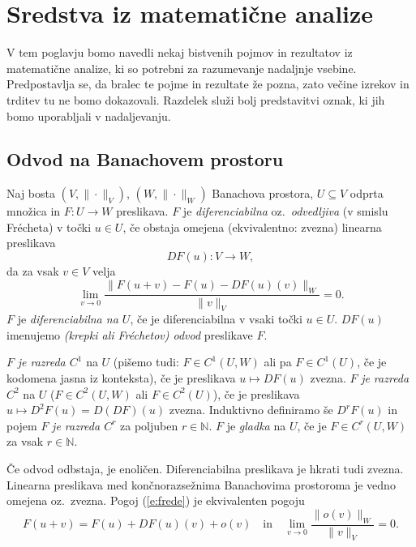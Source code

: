 \chapter{Sredstva iz matematične analize}


V tem poglavju bomo navedli nekaj bistvenih pojmov in rezultatov iz matematične analize,
ki so potrebni za razumevanje nadaljnje vsebine. Predpostavlja
se, da bralec te pojme in rezultate že pozna, zato večine izrekov in trditev
tu ne bomo dokazovali. Razdelek služi bolj predstavitvi oznak, ki jih
bomo uporabljali v nadaljevanju.


\section{Odvod na Banachovem prostoru}


\begin{definicija} \label{def:odvod}
	Naj bosta $(V,\|\cdot\|_V)$, $(W,\|\cdot\|_W)$ Banachova prostora, $U\subseteq V$ odprta
	množica in $F\colon U\to W$ preslikava. $F$ je \emph{diferenciabilna} oz.~\emph{odvedljiva}
	(v smislu Frécheta) v točki $u\in U$, če obstaja omejena (ekvivalentno: zvezna) linearna preslikava
	\[ DF(u)\colon V\to W, \]
	da za vsak $v\in V$ velja
	\begin{equation} \label{e:frede}
		\lim_{v\to 0}\frac{\|F(u+v)-F(u)-DF(u)(v)\|_W}{\|v\|_V}=0.
	\end{equation}
	$F$ je \emph{diferenciabilna na $U$}, če je diferenciabilna v vsaki točki $u\in U$.
	$DF(u)$ imenujemo \emph{(krepki ali Fréchetov) odvod} preslikave $F$.
	
	$F$ \emph{je razreda $C^1$} na $U$ (pišemo tudi: $F\in C^1(U,W)$ ali pa $F\in C^1(U)$,
	če je kodomena jasna iz konteksta), če je preslikava $u\mapsto DF(u)$ zvezna.
	$F$ \emph{je razreda $C^2$} na $U$ ($F\in C^2(U,W)$ ali $F\in C^2(U)$),
	če je preslikava $u\mapsto D^2F(u)=D(DF)(u)$ zvezna. Induktivno definiramo še $D^rF(u)$ in pojem
	$F$ \emph{je razreda $C^r$} za poljuben $r\in\mathbb{N}$. $F$ je \emph{gladka} na $U$,
	če je $F\in C^r(U,W)$ za vsak $r\in\mathbb{N}$.
\end{definicija}

Če odvod odbstaja, je enoličen. Diferenciabilna preslikava je hkrati tudi zvezna.
Linearna preslikava med končnorazsežnima Banachovima prostoroma je vedno omejena
oz.~zvezna. Pogoj (\ref{e:frede}) je ekvivalenten pogoju
\begin{equation*} %
	F(u+v)=F(u)+DF(u)(v)+o(v)\quad\textrm{in}\quad
	\lim_{v\to 0}\frac{\|o(v)\|_W}{\|v\|_V}=0.
\end{equation*}

